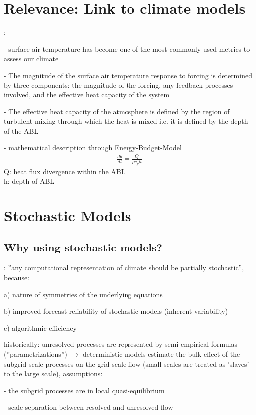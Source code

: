 \documentclass[11pt]{article}
\begin{document}
	\section{Relevance: Link to climate models}
	\citet{Davy2014}:
	\begin{compactenum}
		\item[-] surface air temperature has become one of the most
commonly-used metrics to assess our climate
		\item[-] The magnitude of the surface air
temperature response to forcing is determined by three components: the magnitude of the forcing, any feedback processes
involved, and the effective heat capacity of the system
		\item[-] The effective heat capacity of the atmosphere is defined by
the region of turbulent mixing through which the heat is
mixed i.e. it is defined by the depth of the ABL
		\item[-] mathematical description through Energy-Budget-Model 
		\begin{align}
			\frac{d\theta}{dt} = \frac{Q}{\rho c_p h} 
		\end{align}
		Q: heat flux divergence within the ABL \\
		h: depth of ABL
		
		
	\end{compactenum}
	
	
	\section{Stochastic Models}
	
	\subsection{Why using stochastic models?}
	\citet{Palmer2019}: ''any computational representation of climate should be
	partially stochastic'', because:
	\begin{compactenum}
		\item[a)] nature of symmetries of the underlying equations
		\item[b)] improved forecast reliability of stochastic models (inherent variability)
		\item[c)] algorithmic efficiency\\
	\end{compactenum}	
	
	historically: unresolved processes are represented by semi-empirical formulas (''parametrizations'') $\rightarrow$ deterministic models estimate the bulk effect of the subgrid-scale processes on the grid-scale flow (small scales are treated as 'slaves' to the large scale), assumptions:
	\begin{compactenum}
		\item[-] the subgrid processes are in local quasi-equilibrium
		\item[-] scale separation between resolved and unresolved flow\\
	\end{compactenum}
	
\end{document}
